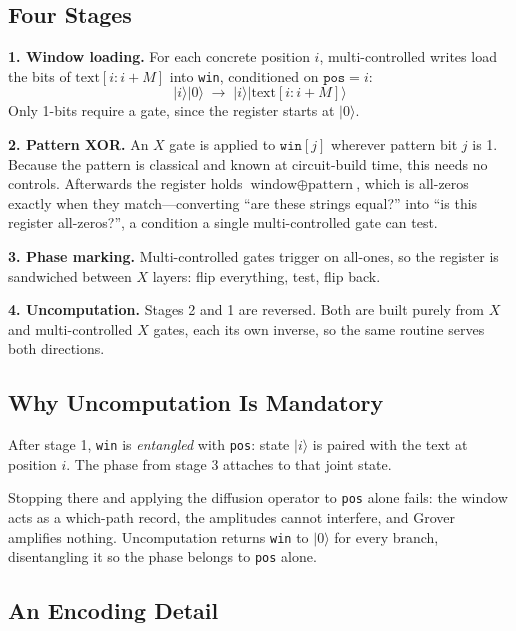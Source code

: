 \documentclass[11pt,a4paper]{article}
\begin{document}
\subsection{Four Stages}

\textbf{1. Window loading.} For each concrete position $i$, multi-controlled
writes load the bits of $\text{text}[i:i+M]$ into \texttt{win}, conditioned on
$\texttt{pos}=i$:
\begin{equation}
|i\rangle|0\rangle \;\longrightarrow\; |i\rangle|\text{text}[i:i+M]\rangle
\end{equation}
Only 1-bits require a gate, since the register starts at $|0\rangle$.

\textbf{2. Pattern XOR.} An $X$ gate is applied to $\texttt{win}[j]$ wherever
pattern bit $j$ is 1. Because the pattern is classical and known at circuit-build
time, this needs no controls. Afterwards the register holds
$\text{window} \oplus \text{pattern}$, which is all-zeros exactly when they
match---converting ``are these strings equal?'' into ``is this register
all-zeros?'', a condition a single multi-controlled gate can test.

\textbf{3. Phase marking.} Multi-controlled gates trigger on all-ones, so the
register is sandwiched between $X$ layers: flip everything, test, flip back.

\textbf{4. Uncomputation.} Stages 2 and 1 are reversed. Both are built purely
from $X$ and multi-controlled $X$ gates, each its own inverse, so the same
routine serves both directions.

\subsection{Why Uncomputation Is Mandatory}

After stage 1, \texttt{win} is \emph{entangled} with \texttt{pos}: state
$|i\rangle$ is paired with the text at position $i$. The phase from stage 3
attaches to that joint state.

Stopping there and applying the diffusion operator to \texttt{pos} alone fails:
the window acts as a which-path record, the amplitudes cannot interfere, and
Grover amplifies nothing. Uncomputation returns \texttt{win} to $|0\rangle$ for
every branch, disentangling it so the phase belongs to \texttt{pos} alone.

\subsection{An Encoding Detail}
\end{document}
